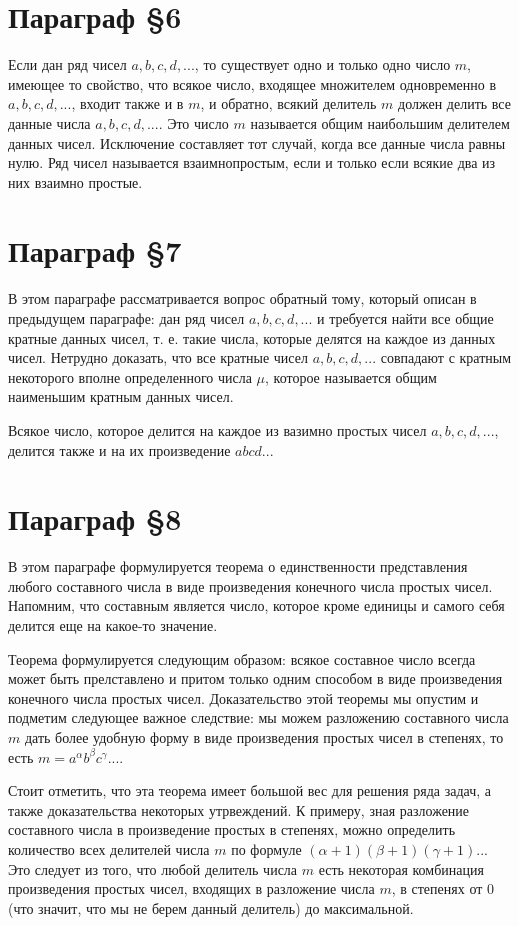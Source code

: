 \section{Параграф \S 6}

Если дан ряд чисел $a,b,c,d,...$, то существует одно и только одно число $m$, имеющее то свойство, что всякое число, входящее множителем одновременно в $a, b, c, d, ...$, входит также и в $m$, и обратно, всякий делитель $m$ должен делить все данные числа $a,b,c,d,...$. Это число $m$ называется общим наибольшим делителем данных чисел. Исключение составляет тот случай, когда все данные числа равны нулю. Ряд чисел называется взаимнопростым, если и только если всякие два из них взаимно простые.

\section{Параграф \S 7}

В этом параграфе рассматривается вопрос обратный тому, который описан в предыдущем параграфе: дан ряд чисел $a,b,c,d,...$ и требуется найти все общие кратные данных чисел, т. е. такие числа, которые делятся на каждое из данных чисел. Нетрудно доказать, что все кратные чисел $a,b,c,d,...$ совпадают с кратным некоторого вполне определенного числа $\mu$, которое называется общим наименьшим кратным данных чисел.

Всякое число, которое делится на каждое из вазимно простых чисел $a,b,c,d,...$, делится также и на их произведение $abcd...$

\section{Параграф \S 8}

В этом параграфе формулируется теорема о единственности представления любого составного числа в виде произведения конечного числа простых чисел. Напомним, что составным является число, которое кроме единицы и самого себя делится еще на какое-то значение. 

Теорема формулируется следующим образом: всякое составное число всегда может быть прелставлено и притом только одним способом в виде произведения конечного числа простых чисел. Доказательство этой теоремы мы опустим и подметим следующее важное следствие: мы можем разложению составного числа $m$ дать более удобную форму в виде произведения простых чисел в степенях, то есть $m = a^{\alpha}b^{\beta}c^{\gamma}...$. 

Стоит отметить, что эта теорема имеет большой вес для решения ряда задач, а также доказательства некоторых утрвеждений. К примеру, зная разложение составного числа в произведение простых в степенях, можно определить количество всех делителей числа $m$ по формуле $(\alpha + 1)(\beta + 1)(\gamma + 1)...$ Это следует из того, что любой делитель числа $m$ есть некоторая комбинация произведения простых чисел, входящих в разложение числа $m$, в степенях от 0 (что значит, что мы не берем данный делитель) до максимальной.

